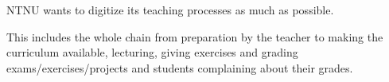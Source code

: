     NTNU wants to digitize its teaching processes as much as possible.

        This includes the whole chain from preparation by the teacher to making the curriculum available, lecturing, giving exercises and grading exams/exercises/projects and students complaining about their grades.